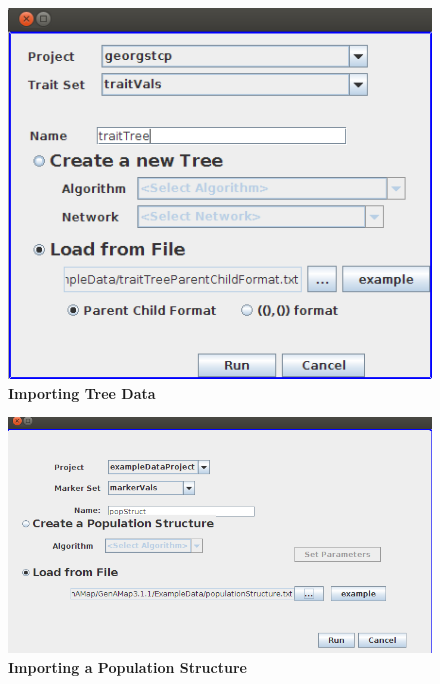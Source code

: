 \documentclass{article}
\begin{document}
\begin{figure}
\includegraphics[width=\textwidth]{Figure8.png}
\caption{\textbf{Importing Tree Data}}
\label{tree}
\end{figure}

\begin{figure}
\includegraphics[width=\textwidth]{Figure9.png}
\caption{\textbf{Importing a Population Structure}}
\label{popstruct}
\end{figure}
\end{document}

